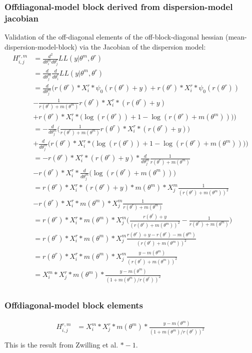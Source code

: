 \documentclass[bibliography=totoc,10pt]{scrartcl}
\begin{document}
\subsubsection{Offdiagonal-model block derived from dispersion-model jacobian}
Validation of the off-diagonal elements of the off-block-diagonal hessian (mean-dispersion-model-block) via the Jacobian of the dispersion model:
\begin{equation}
\begin{split}
H^{r,m}_{i,j} &= \frac{d^2}{d \theta^m_i d \theta^r_j} LL(y|\theta^m, \theta^r) \\
&= \frac{d}{d \theta^m_j} \frac{d}{d \theta^r_i} LL(y|\theta^m, \theta^r) \\
&= \frac{d}{d \theta^m_j} \bigg( r(\theta^r) * X^r_{i} * \psi_0(r(\theta^r)+y)+ r(\theta^r) * X^r_{i} * \psi_0(r(\theta^r)) \\
&- \frac{1}{r(\theta^r)+m(\theta^m)} r(\theta^r) * X^r_{i}  *(r(\theta^r) + y) \\
&+ r(\theta^r) * X^r_{i}  * \bigg( \log(r(\theta^r)) + 1 - \log(r(\theta^r)+m(\theta^m)) \bigg) \bigg) \\
&= -\frac{d}{d \theta^m_j} \bigg( \frac{1}{r(\theta^r)+m(\theta^m)} r(\theta^r) * X^r_{i}  *(r(\theta^r) + y) \bigg) \\
&+ \frac{d}{d \theta^m_j} \bigg( r(\theta^r) * X^r_{i}  * \bigg( \log(r(\theta^r)) + 1 - \log(r(\theta^r)+m(\theta^m)) \bigg) \bigg) \\
&= -r(\theta^r) * X^r_{i}  *(r(\theta^r) + y) * \frac{d}{d \theta^m_j} \frac{1}{r(\theta^r)+m(\theta^m)}  \\
&- r(\theta^r) * X^r_{i}  * \frac{d}{d \theta^m_j} \bigg( \log(r(\theta^r)+m(\theta^m))  \bigg) \\
&= r(\theta^r) * X^r_{i}  *(r(\theta^r) + y) * m(\theta^m) * X^m_{j}  \frac{1}{(r(\theta^r)+m(\theta^m))^2}  \\
&- r(\theta^r) * X^r_{i}  * m(\theta^m) * X^m_{j}  \frac{1}{r(\theta^r)+m(\theta^m)} \\
&= r(\theta^r) * X^r_{i}  * m(\theta^m) * X^m_{j}  \bigg( \frac{r(\theta^r) + y}{(r(\theta^r)+m(\theta^m))^2}  - \frac{1}{r(\theta^r)+m(\theta^m)} \bigg) \\
&= r(\theta^r) * X^r_{i}  * m(\theta^m) * X^m_{j}  \frac{r(\theta^r) + y - r(\theta^r) - m(\theta^m) }{(r(\theta^r)+m(\theta^m))^2}  \\
&= r(\theta^r) * X^r_{i}  * m(\theta^m) * X^m_{j}  \frac{y  - m(\theta^m) }{(r(\theta^r)+m(\theta^m))^2}  \\
&=  X^m_{i} * X^r_{j}  * m(\theta^m) * \frac{y - m(\theta^m)}{(1+m(\theta^m)/ r(\theta^r))^2} \\
\end{split}
\end{equation}

\subsubsection{Offdiagonal-model block elements}
\begin{equation}
\begin{split}
H^{r,m}_{i,j} &=X^m_{i} * X^r_{j}  * m(\theta^m) * \frac{y - m(\theta^m)}{(1+m(\theta^m)/ r(\theta^r))^2} \\
\end{split}
\end{equation}
This is the result from Zwilling et al. $*-1$.
\end{document}
